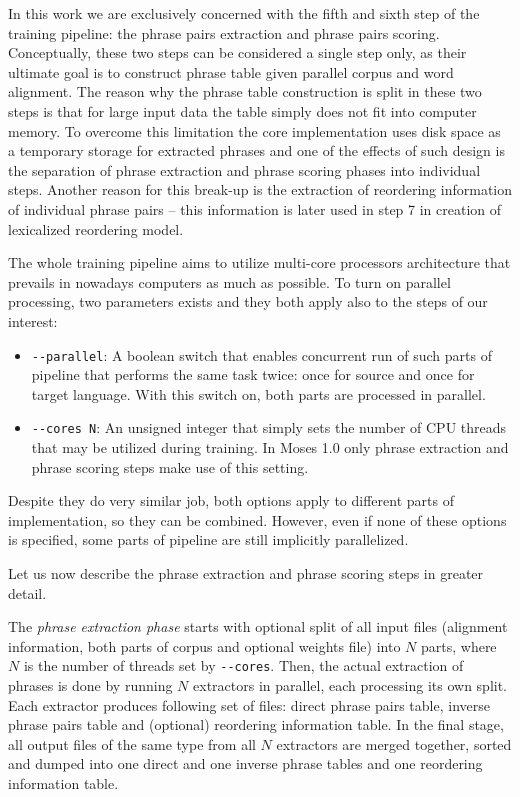 In this work we are exclusively concerned with the fifth and sixth step of
the training pipeline:
the phrase pairs extraction
and phrase pairs scoring.
Conceptually, these two steps can be considered a single step only, as their ultimate
goal is to construct phrase table given parallel corpus and word alignment.
The reason why the phrase table construction is split in these two steps is that
for large input data the table simply does not fit into computer memory.
To overcome this limitation the core implementation uses disk space as a temporary storage
for extracted phrases and one of the effects of such design is the separation of
phrase extraction and phrase scoring phases into individual steps.
Another reason for this break-up is the extraction of reordering information
of individual phrase pairs -- this information is later used in step 7 in creation
of lexicalized reordering model.

The whole training pipeline aims to utilize multi-core processors architecture that
prevails in nowadays computers as much as possible. To turn on parallel processing,
two parameters exists and they both apply also to the steps of our interest:
\begin{itemize}
  \item \verb|--parallel|: A boolean switch that enables concurrent run of such parts of
  pipeline that performs the same task twice: once for source and once for target language.
  With this switch on, both parts are processed in parallel.
  \item \verb|--cores N|: An unsigned integer that simply sets the number of CPU threads
  that may be utilized during training. In Moses 1.0 only phrase extraction and phrase
  scoring steps make use of this setting.
\end{itemize}
Despite they do very similar job, both options apply to different parts
of implementation, so they can be combined.
However, even if none of these options is specified, some parts of pipeline
are still implicitly parallelized.

Let us now describe the phrase extraction and phrase scoring steps in greater detail.

The \emph{phrase extraction phase} starts with optional split of all input files
(alignment information, both parts of corpus and optional weights file) into $N$
parts, where $N$ is the number of threads set by \verb|--cores|.
Then, the actual extraction of phrases is done by running $N$ extractors in parallel,
each processing its own split.
Each extractor produces following set of files: direct phrase pairs table, inverse
phrase pairs table and (optional) reordering information table.
In the final stage, all output files of the same type from all $N$ extractors are
merged together, sorted and dumped into one direct and one inverse phrase tables
and one reordering information table.

